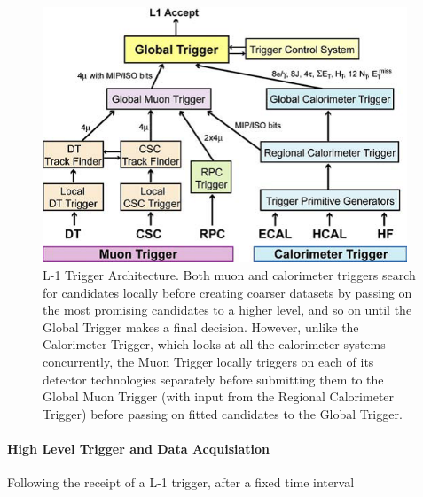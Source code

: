 \begin{figure}[htbp]
\begin{center}
\includegraphics[width=0.97\textwidth]{figs/cms/trigger.png}
\caption{L-1 Trigger Architecture. Both muon and calorimeter triggers search for candidates locally before creating coarser datasets by passing on the most promising candidates to a higher level, and so on until the Global Trigger makes a final decision. However, unlike the Calorimeter Trigger, which looks at all the calorimeter systems concurrently, the Muon Trigger locally triggers on each of its detector technologies separately before submitting them to the Global Muon Trigger (with input from the Regional Calorimeter Trigger) before passing on fitted candidates to the Global Trigger.}
\label{fig:trigger}
\end{center}
\end{figure}


\paragraph{High Level Trigger and Data Acquisiation}\label{paragraph:HLT}
Following the receipt of a L-1 trigger, after a fixed time interval